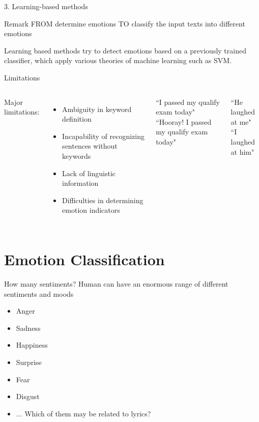 \documentclass[xcolor=dvipsnames]{beamer}
\begin{document}
\begin{frame}{3. Learning-based methods}
\begin{block}{Remark}
FROM determine emotions TO classify the input texts into different emotions
\end{block}
Learning based methods try to detect emotions based on a previously trained classifier, which apply various theories of machine learning such as SVM.
\end{frame}

\begin{frame}{Limitations}
\begin{columns}
Major limitations:
\begin{itemize}
\item Ambiguity in keyword definition
\item Incapability of recognizing sentences without keywords
\item Lack of linguistic information
\item Difficulties in determining emotion indicators
\end{itemize}
\begin{example}
``I passed my qualify exam today"\\
``Hooray! I passed my qualify exam today"
\end{example}
\begin{example}
``He laughed at me"\\
``I laughed at him"
\end{example}
\end{columns}
\end{frame}



\section{Emotion Classification}

\begin{frame}{How many sentiments?}
Human can have an enormous range of different sentiments and moods
\begin{itemize}
\item Anger
\item Sadness
\item Happiness
\item Surprise
\item Fear
\item Disgust
\item ...
Which of them may be related to lyrics?
\end{itemize}
\end{frame}
\end{document}
